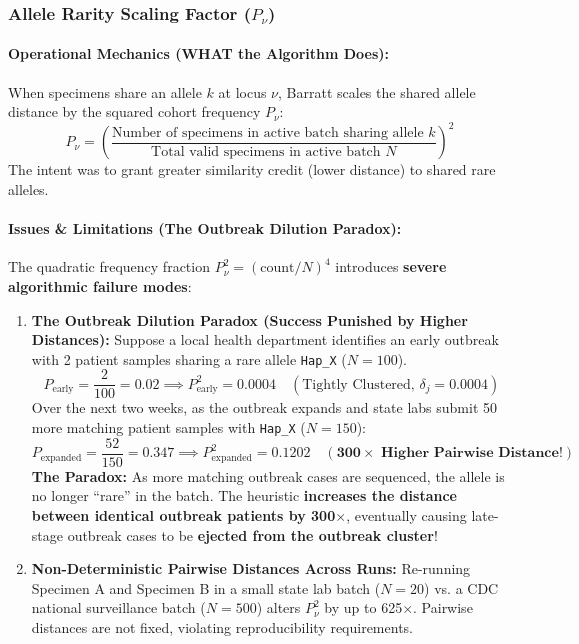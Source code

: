 \documentclass[11pt,a4paper]{article}
\begin{document}
\subsubsection{Allele Rarity Scaling Factor (\texorpdfstring{$P_\nu$}{P\_nu})}

\paragraph{Operational Mechanics (WHAT the Algorithm Does):}
When specimens share an allele $k$ at locus $\nu$, Barratt scales the shared allele distance by the squared cohort frequency $P_\nu$:
\begin{equation}
P_\nu = \left( \frac{\text{Number of specimens in active batch sharing allele } k}{\text{Total valid specimens in active batch } N} \right)^2
\end{equation}
The intent was to grant greater similarity credit (lower distance) to shared rare alleles.

\paragraph{Issues \& Limitations (The Outbreak Dilution Paradox):}
The quadratic frequency fraction $P_\nu^2 = (\text{count}/N)^4$ introduces \textbf{severe algorithmic failure modes}:
\begin{enumerate}[leftmargin=*]
    \item \textbf{The Outbreak Dilution Paradox (Success Punished by Higher Distances):} Suppose a local health department identifies an early outbreak with 2 patient samples sharing a rare allele \texttt{Hap\_X} ($N=100$).
    \begin{equation}
    P_{\text{early}} = \frac{2}{100} = 0.02 \implies P_{\text{early}}^2 = \mathbf{0.0004} \quad (\text{Tightly Clustered, } \delta_j = 0.0004)
    \end{equation}
    Over the next two weeks, as the outbreak expands and state labs submit 50 more matching patient samples with \texttt{Hap\_X} ($N=150$):
    \begin{equation}
    P_{\text{expanded}} = \frac{52}{150} = 0.347 \implies P_{\text{expanded}}^2 = \mathbf{0.1202} \quad (\mathbf{300\times \text{ Higher Pairwise Distance!}})
    \end{equation}
    \textbf{The Paradox:} As more matching outbreak cases are sequenced, the allele is no longer ``rare'' in the batch. The heuristic \textbf{increases the distance between identical outbreak patients by 300$\times$}, eventually causing late-stage outbreak cases to be \textbf{ejected from the outbreak cluster}!
    \item \textbf{Non-Deterministic Pairwise Distances Across Runs:} Re-running Specimen A and Specimen B in a small state lab batch ($N=20$) vs. a CDC national surveillance batch ($N=500$) alters $P_\nu^2$ by up to 625$\times$. Pairwise distances are not fixed, violating reproducibility requirements.
\end{enumerate}
\end{document}
